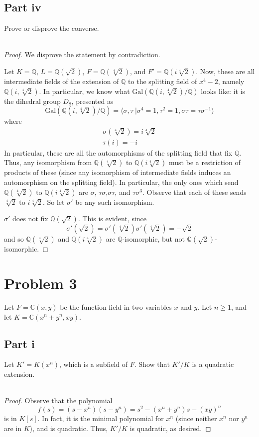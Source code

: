 \documentclass[12pt,reqno]{amsart}
\newcommand{\C}{\mathbb{C}}
\newcommand{\Q}{\mathbb{Q}}
\begin{document}
\subsection*{Part iv}
Prove or disprove the converse.
\\
\\
\begin{proof}
    We disprove the statement by contradiction.

    Let $K = \Q$, $L=\Q(\sqrt{2})$, $F=\Q(\sqrt[4]{2})$, and $F' =
    \Q(i\sqrt[4]{2})$. Now, these are all intermediate fields of the extension
    of $\Q$ to the splitting field of $x^4-2$, namely $\Q(i,\sqrt[4]{2})$. In
    particular, we know what $\text{Gal}(\Q(i,\sqrt[4]{2})/\Q)$ looks like: it
    is the dihedral group $D_8$, presented as
    \[
        \text{Gal}(\Q(i,\sqrt[4]{2})/\Q) = 
        \langle \sigma,\tau\ |\sigma^4=1,\tau^2=1,\sigma\tau =
        \tau\sigma^{-1}\rangle
    \]
    where
    \[
\begin{aligned}
    \sigma(\sqrt[4]{2})= i\sqrt[4]{2}\\
    \tau(i)= -i
\end{aligned}
    \]
    In particular, these are all the automorphisms of the splitting field that
    fix $\Q$. Thus, any isomorphism from $\Q(\sqrt[4]{2})$ to
    $\Q(i\sqrt[4]{2})$ must be a restriction of products of these (since any
        isomorphism of intermediate fields induces an automorphism on the
    splitting field). In particular, the only ones which send $\Q(\sqrt[4]{2})$
    to $\Q(i\sqrt[4]{2})$ are $\sigma$, $\tau\sigma$,$\sigma\tau$, and
    $\tau\sigma^3$. Observe that each of these sends $\sqrt[4]{2}$ to
    $i\sqrt[4]{2}$. So let $\sigma'$ be any such isomorphism.

    $\sigma'$ does not fix $\Q(\sqrt{2})$. This is evident, since
    \[
        \sigma'(\sqrt{2}) = \sigma'(\sqrt[4]{2})\sigma'(\sqrt[4]{2}) =
        -\sqrt{2}
    \]
    and so $\Q(\sqrt[4]{2})$ and $\Q(i\sqrt[4]{2})$ are $\Q$-isomorphic, but not
    $\Q(\sqrt{2})$-isomorphic.
\end{proof}

\newpage

\section*{Problem 3}
Let $F=\C(x,y)$ be the function field in two variables $x$ and $y$. Let $n\geq
1$, and let $K = \C(x^n+y^n,xy)$.
\subsection*{Part i}
Let $K'=K(x^n)$, which is a subfield of $F$. Show that $K'/K$ is a quadratic
extension.
\\
\\
\begin{proof}
    Observe that the polynomial
    \[
        f(s) = (s-x^n)(s-y^n) = s^2 - (x^n+y^n)s + (xy)^n
    \]
    is in $K[s]$. In fact, it is the minimal polynomial for $x^n$ (since neither
    $x^n$ nor $y^n$ are in $K$), and is
    quadratic. Thus, $K'/K$ is quadratic, as desired.
\end{proof}
\end{document}
